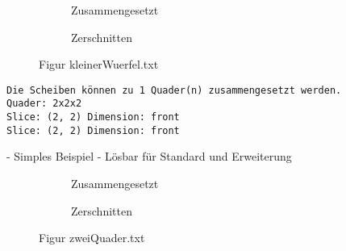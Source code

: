\documentclass[a4paper,10pt,ngerman]{scrartcl}
\newcommand{\simplecube}[8]%
{
    \begin{scope}[shift={#1}]
        \fill[gray!40,canvas is yz plane at x=#2, opacity=#8] (0,0) rectangle (#3,#4);
        \fill[gray!10,canvas is xz plane at y=#3, opacity=#8] (0,0) rectangle (#2,#4);
        \fill[white  ,canvas is xy plane at z=#4, opacity=#8] (0,0) rectangle (#2,#3);
        \foreach\i/\j in {0/1, 1/1, 1/0}
            {
            \draw[line#5] (0,#3*\i,#4*\j) --++ (#2,0,0);
            \draw[line#6] (#2*\i,0,#4*\j) --++ (0,#3,0);
            \draw[line#7] (#2*\i,#3*\j,0) --++ (0,0,#4);
        }
    \end{scope}
}
\newcommand{\smallSquare}[4]%
{
    \begin{scope}[shift={#1}]
        \simplecube{(0,     0,      0)}     {1}{2}{2}   {a}{a}{a}   {1}
        \simplecube{(1+#4,   0,      0))}    {1}{2}{2}   {a}{a}{a}   {1}
    \end{scope}
}
\newcommand{\unsolvedSquare}[4]%
{
    \begin{scope}[shift={#1}]
        \simplecube{(0,     0,      0)}     {1}{2}{2}   {a}{a}{a}   {1}
        \simplecube{(1+#4,   0,      0))}    {1}{2}{2}   {a}{a}{a}   {1}
        \simplecube{(2+2*#4,   0,      0))}    {1}{1}{1}   {a}{a}{a}   {1}
    \end{scope}
}
\begin{document}
    \begin{figure}[H]
        \centering
        \def\a{3.2}
        \def\b{1.2}
        \begin{subfigure}[b]{0.45\textwidth}
            \centering %
            \caption{Zusammengesetzt}\label{fig:figA2}
        \end{subfigure}
        \begin{subfigure}[b]{0.45\textwidth}
            \centering %
            \caption{Zerschnitten}\label{fig:figB2}
        \end{subfigure}
        \caption{Figur kleinerWuerfel.txt}\label{fig:figAB2}
    \end{figure}

    \begin{lstlisting}[frame=single, title=Programmausgabe kleinerWuerfel.txt, breaklines=true,label={lst:lstlisting3}]
Die Scheiben können zu 1 Quader(n) zusammengesetzt werden.
Quader: 2x2x2
Slice: (2, 2) Dimension: front
Slice: (2, 2) Dimension: front
    \end{lstlisting}

    - Simples Beispiel
    - Lösbar für Standard und Erweiterung


    \begin{figure}[H]
        \centering
        \def\a{3.2}
        \def\b{1.2}
        \begin{subfigure}[b]{0.45\textwidth}
            \centering %
            \caption{Zusammengesetzt}\label{fig:figA3}
        \end{subfigure}
        \begin{subfigure}[b]{0.45\textwidth}
            \centering %
            \caption{Zerschnitten}\label{fig:figB3}
        \end{subfigure}
        \caption{Figur zweiQuader.txt}\label{fig:figAB3}
    \end{figure}
\end{document}
